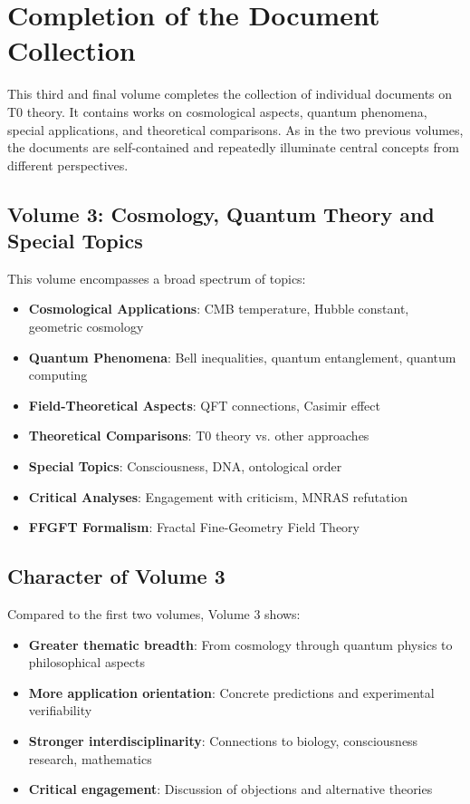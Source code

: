 \section*{Completion of the Document Collection}

This third and final volume completes the collection of individual documents on T0 theory. It contains works on cosmological aspects, quantum phenomena, special applications, and theoretical comparisons. As in the two previous volumes, the documents are self-contained and repeatedly illuminate central concepts from different perspectives.

\subsection*{Volume 3: Cosmology, Quantum Theory and Special Topics}

This volume encompasses a broad spectrum of topics:

\begin{itemize}
\item \textbf{Cosmological Applications}: CMB temperature, Hubble constant, geometric cosmology
\item \textbf{Quantum Phenomena}: Bell inequalities, quantum entanglement, quantum computing
\item \textbf{Field-Theoretical Aspects}: QFT connections, Casimir effect
\item \textbf{Theoretical Comparisons}: T0 theory vs. other approaches
\item \textbf{Special Topics}: Consciousness, DNA, ontological order
\item \textbf{Critical Analyses}: Engagement with criticism, MNRAS refutation
\item \textbf{FFGFT Formalism}: Fractal Fine-Geometry Field Theory
\end{itemize}

\subsection*{Character of Volume 3}

Compared to the first two volumes, Volume 3 shows:

\begin{itemize}
\item \textbf{Greater thematic breadth}: From cosmology through quantum physics to philosophical aspects
\item \textbf{More application orientation}: Concrete predictions and experimental verifiability
\item \textbf{Stronger interdisciplinarity}: Connections to biology, consciousness research, mathematics
\item \textbf{Critical engagement}: Discussion of objections and alternative theories
\end{itemize}

